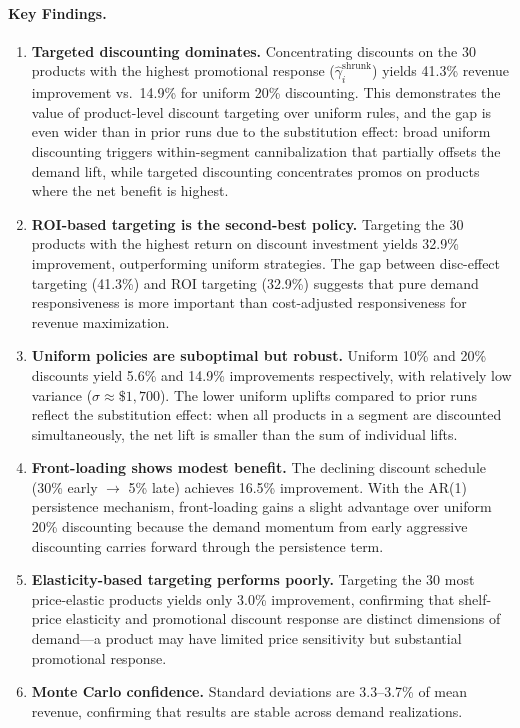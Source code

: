 \documentclass[12pt,a4paper]{article}
\begin{document}
\paragraph{Key Findings.}

\begin{enumerate}[nosep]
\item \textbf{Targeted discounting dominates.} Concentrating
discounts on the 30 products with the highest promotional response
($\hat{\gamma}_i^{\text{shrunk}}$) yields 41.3\% revenue improvement
vs.\ 14.9\% for uniform 20\% discounting. This demonstrates the
value of product-level discount targeting over uniform rules, and the
gap is even wider than in prior runs due to the substitution effect:
broad uniform discounting triggers within-segment cannibalization
that partially offsets the demand lift, while targeted discounting
concentrates promos on products where the net benefit is highest.

\item \textbf{ROI-based targeting is the second-best policy.}
Targeting the 30 products with the highest return on discount
investment yields 32.9\% improvement, outperforming uniform
strategies. The gap between disc-effect targeting (41.3\%) and
ROI targeting (32.9\%) suggests that pure demand responsiveness is
more important than cost-adjusted responsiveness for revenue
maximization.

\item \textbf{Uniform policies are suboptimal but robust.} Uniform
10\% and 20\% discounts yield 5.6\% and 14.9\% improvements
respectively, with relatively low variance ($\sigma \approx
\$1{,}700$). The lower uniform uplifts compared to prior runs
reflect the substitution effect: when all products in a segment
are discounted simultaneously, the net lift is smaller than the sum
of individual lifts.

\item \textbf{Front-loading shows modest benefit.} The declining
discount schedule (30\% early $\to$ 5\% late) achieves 16.5\%
improvement. With the AR(1) persistence mechanism, front-loading
gains a slight advantage over uniform 20\% discounting because
the demand momentum from early aggressive discounting carries
forward through the persistence term.

\item \textbf{Elasticity-based targeting performs poorly.} Targeting
the 30 most price-elastic products yields only 3.0\% improvement,
confirming that shelf-price elasticity and promotional discount
response are distinct dimensions of demand---a product may have
limited price sensitivity but substantial promotional response.

\item \textbf{Monte Carlo confidence.} Standard deviations are
3.3--3.7\% of mean revenue, confirming that results are stable
across demand realizations.
\end{enumerate}
\end{document}

